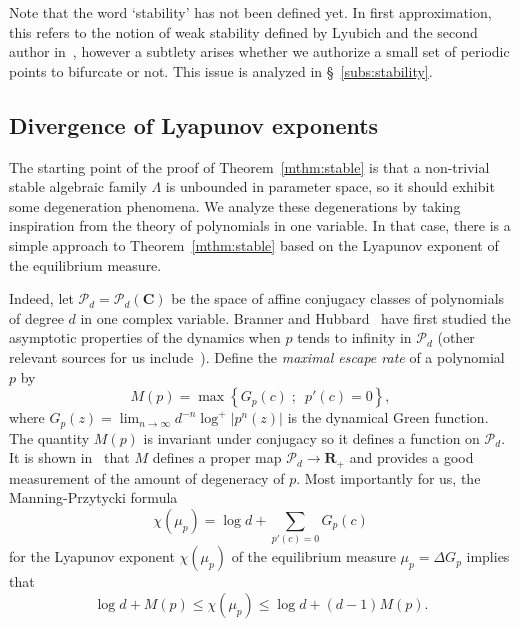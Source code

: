 \documentclass[oneside, 12pt]{amsart}
\newcommand{\set}[1]{\left\{#1\right\}}
\newcommand{\abs}[1]{\left\vert#1\right\vert}
\newcommand{\inv}{^{-1}}
\newcommand{\C}{\mathbf{C}}
\newcommand{\R}{\mathbf{R}}
\theoremstyle{plain}
\theoremstyle{definition}
\numberwithin{equation}{section}       %
\numberwithin{equation}{section}       %
\begin{document}
Note that the word   `stability' has not been defined yet.
In  first approximation, this refers  to the   notion of 
 weak stability defined by  Lyubich and the second author in~\cite{tangencies}, 
however  a subtlety arises whether we authorize a small set of periodic points to bifurcate or not. This issue is 
  analyzed in \S~\ref{subs:stability}.
 
 
\subsection{Divergence  of Lyapunov exponents}\label{par:intro_divergence_of_Lyap}
The starting point of the proof of Theorem~\ref{mthm:stable}  is that a non-trivial stable algebraic family $\Lambda$
is  unbounded in parameter space, so it should exhibit some degeneration phenomena. 
  We analyze  these degenerations by  taking  inspiration from the 
theory of polynomials in one variable. In that case, there is 
a simple  approach to Theorem~\ref{mthm:stable} based on the Lyapunov
exponent of the equilibrium measure. 

  Indeed, let $\mathcal P_d = \mathcal P_d(\C)$ be the space of affine conjugacy classes of polynomials of degree $d$ in one complex variable. 
Branner and Hubbard~\cite{branner-hubbard1} 
have first studied the asymptotic properties of the dynamics when $p$ tends to infinity in 
$\mathcal P_d$ (other relevant sources for us include~\cite{DeMarco-McMullen, huguin:polynomials}). 
Define the \emph{maximal escape rate} of a polynomial $p$ by 
\begin{equation}
\label{eq:maximal_escape_rate_intro}
M(p)= \max\set{G_p(c)\; ; \; \ p'(c)=0},
\end{equation}
where $G_p(z) = \lim_{n\to\infty} d^{-n} \log^+ \abs{p^n(z)}$ is the dynamical Green function.
The quantity $M(p)$ is invariant under conjugacy so it defines a function on $\mathcal P_d$. 
It is shown in~\cite{branner-hubbard1} that $M$ defines a proper map $\mathcal P_d  \to \R_+$  
and provides a good measurement of the amount of degeneracy of $p$.
 Most importantly for us,  the Manning-Przytycki formula  \cite{manning, przytycki} 
  \begin{equation}\label{eq:manning-przytycki}
 \chi(\mu_p)= \log d+  \sum_{ p'(c)=0} G_p(c)
\end{equation}
 for the Lyapunov exponent 
 $\chi(\mu_p)$ 
 of the equilibrium measure $\mu_p=\Delta G_p$ 
     implies that  
\begin{equation}\label{eq:lyap_1D}
\log d+ M(p)\leq \chi(\mu_p)\leq \log d+ (d-1)M(p).
\end{equation}
\end{document}
